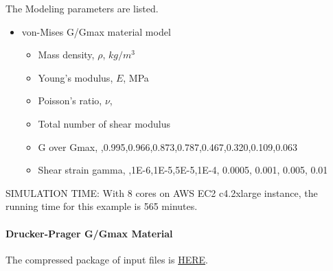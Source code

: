 The Modeling parameters are listed.
\begin{itemize}
  \item von-Mises G/Gmax material model 
  \begin{itemize}
    \item Mass density, $\rho$, \enspace {} $kg/m^3$
    \item Young's modulus, $E$, \enspace {} MPa
    \item Poisson's ratio, $\nu$, \enspace {}
    \item Total number of shear modulus \enspace {}
    \item G over Gmax, \enspace {},0.995,0.966,0.873,0.787,0.467,0.320,0.109,0.063
    \item Shear strain gamma, \enspace {},1E-6,1E-5,5E-5,1E-4, 0.0005, 0.001, 0.005, 0.01
  \end{itemize}
\end{itemize}


SIMULATION TIME: With 8 cores on AWS EC2 c4.2xlarge instance, the running time for this example is 565 minutes.

\paragraph{Drucker-Prager G/Gmax Material}
The compressed package of input files is  
\href{https://github.com/yuan-energy/Real-ESSI-Short-Course-Examples/tree/master/short-course-examples/nonlinear_analysis_steps/free_field_3D/DruckerPragerGoverGmax/DruckerPragerGoverGmax.tgz?raw=true}{HERE}. 

